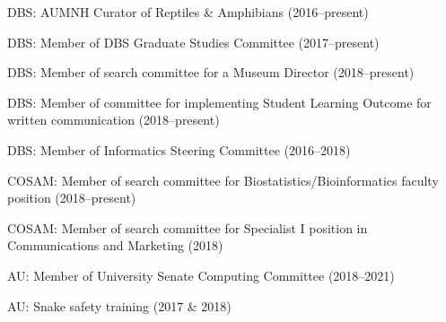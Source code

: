 \begin{veryTightItemize}
    \item DBS: AUMNH Curator of Reptiles \& Amphibians (2016--present)
    \item DBS: Member of DBS Graduate Studies Committee (2017--present)
    \item DBS: Member of search committee for a Museum Director (2018--present)
    \item DBS: Member of committee for implementing Student Learning Outcome
        for written communication (2018--present)
    \item DBS: Member of Informatics Steering Committee (2016--2018)
    \item COSAM: Member of search committee for Biostatistics/Bioinformatics
        faculty position (2018--present)
    \item COSAM: Member of search committee for Specialist I position in
        Communications and Marketing (2018)
    \item AU: Member of University Senate Computing Committee (2018--2021)
    \item AU: Snake safety training (2017 \& 2018)
\end{veryTightItemize}
